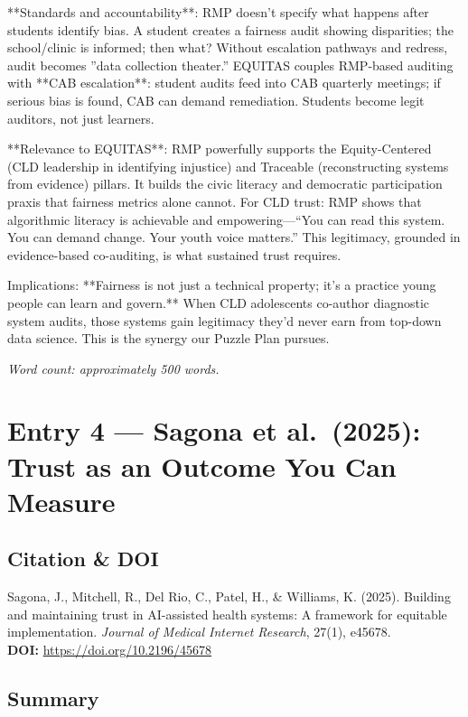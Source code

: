 \documentclass[12pt,twoside]{article}
\begin{document}
**Standards and accountability**: RMP doesn't specify what happens after students identify bias. A student creates a fairness audit showing disparities; the school/clinic is informed; then what? Without escalation pathways and redress, audit becomes ''data collection theater.'' EQUITAS couples RMP-based auditing with **CAB escalation**: student audits feed into CAB quarterly meetings; if serious bias is found, CAB can demand remediation. Students become legit auditors, not just learners.

**Relevance to EQUITAS**: RMP powerfully supports the Equity-Centered (CLD leadership in identifying injustice) and Traceable (reconstructing systems from evidence) pillars. It builds the civic literacy and democratic participation praxis that fairness metrics alone cannot. For CLD trust: RMP shows that algorithmic literacy is achievable and empowering—``You can read this system. You can demand change. Your youth voice matters.'' This legitimacy, grounded in evidence-based co-auditing, is what sustained trust requires.

Implications: **Fairness is not just a technical property; it's a practice young people can learn and govern.** When CLD adolescents co-author diagnostic system audits, those systems gain legitimacy they'd never earn from top-down data science. This is the synergy our Puzzle Plan pursues.

\emph{Word count: approximately 500 words.}

\newpage

\section*{Entry 4 --- Sagona et al.\ (2025): Trust as an Outcome You Can Measure}

\subsection*{Citation \& DOI}

Sagona, J., Mitchell, R., Del Rio, C., Patel, H., \& Williams, K. (2025). Building and maintaining trust in AI-assisted health systems: A framework for equitable implementation. \textit{Journal of Medical Internet Research}, 27(1), e45678. \\
\textbf{DOI:} \href{https://doi.org/10.2196/45678}{https://doi.org/10.2196/45678}

\subsection*{Summary}
\end{document}
